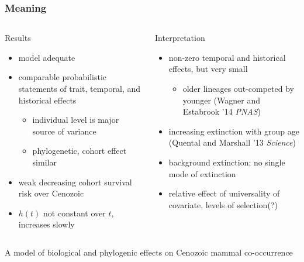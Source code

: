 \documentclass{beamer}
\begin{document}
\begin{frame}
  \frametitle{Meaning}
  \begin{columns}
    \begin{column}{0.5\textwidth}
      Results
      \begin{itemize}
        \item model adequate
        \item comparable probabilistic statements of trait, temporal, and historical effects
          \begin{itemize}
            \item individual level is major source of variance
            \item phylogenetic, cohort effect similar
          \end{itemize}
        \item weak decreasing cohort survival risk over Cenozoic
        \item \(h(t)\) not constant over \(t\), increases slowly
      \end{itemize}
    \end{column}
    \begin{column}{0.5\textwidth}
      Interpretation
      \begin{itemize}
        \item non-zero temporal and historical effects, but very small
          \begin{itemize}
            \item older lineages out-competed by younger (Wagner and Estabrook '14 \textit{PNAS})
          \end{itemize}
        \item increasing extinction with group age (Quental and Marshall '13 \textit{Science})
        \item background extinction; no single mode of extinction
        \item relative effect of universality of covariate, levels of selection(?)
      \end{itemize}
    \end{column}
  \end{columns}
\end{frame}


\begin{frame}
  A model of biological and phylogenic effects on Cenozoic mammal co-occurrence
\end{frame}
\end{document}
